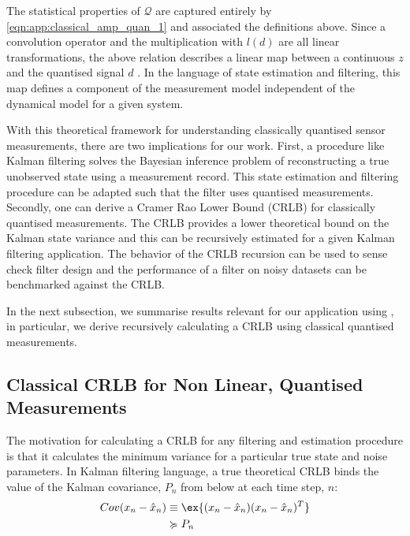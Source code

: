 The statistical properties of $\mathcal{Q}$ are captured entirely by \cref{eqn:app:classical_amp_quan_1} and associated the definitions above. Since a convolution operator and the multiplication with $l(d)$ are all linear transformations, the above relation describes a linear map between a continuous $z$ and the quantised signal $d$  \cite{widrow1996}.  In the language of state estimation and filtering, this map defines a component of the measurement model independent of the dynamical model for a given system. 

With this theoretical framework for understanding classically quantised sensor measurements, there are two implications for our work. First, a procedure like Kalman filtering solves the Bayesian inference problem of reconstructing a true unobserved state using a measurement record. This state estimation and filtering procedure can be adapted such that the filter uses quantised measurements. Secondly, one can derive a Cramer Rao Lower Bound (CRLB) for classically quantised measurements. The CRLB provides a lower theoretical bound on the Kalman state variance and this can be recursively estimated for a given Kalman filtering application. The behavior of the CRLB recursion can be used to sense check filter design and the performance of a filter on noisy datasets can be benchmarked against the CRLB.

In the next subsection, we summarise results relevant for our application using \cite{karlsson2005}, in particular, we derive recursively calculating a CRLB using classical quantised measurements.

\subsection{Classical CRLB for Non Linear, Quantised Measurements}

The motivation for calculating a CRLB for any filtering and estimation procedure is that it calculates the minimum variance for a particular true state and noise parameters. In Kalman filtering language, a true theoretical CRLB binds the value of the Kalman covariance, $P_n$ from below at each time step, $n$:
\begin{align}
Cov(x_n- \hat{x}_n) & \equiv \ex{(x_n - \hat{x}_n)(x_n- \hat{x}_n)^T} \\
& \succcurlyeq P_n 
\end{align}
 
